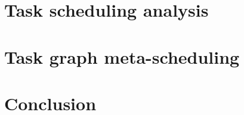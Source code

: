 \documentclass[english,phd]{diploma}
\begin{document}
\MakeTitlePages

\printglossaries

\listoffigures
\clearpage

\listoftables
\clearpage

\nocite{estee, rsds, ligate}

%

%

%

%

\chapter{Task scheduling analysis}
\label{ch:estee}


%

\chapter{Task graph meta-scheduling}
\label{ch:hyperqueue}


\chapter{Conclusion}
\label{ch:conclusion}

\end{document}
